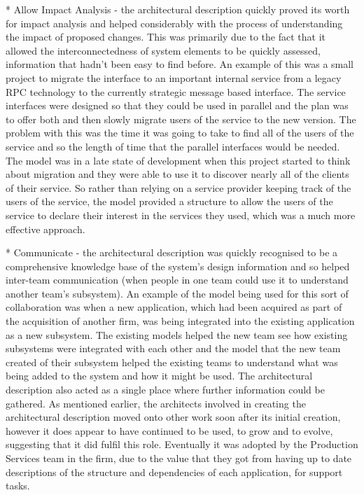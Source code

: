 \begin{itemise}
* Allow Impact Analysis - the architectural description quickly proved its worth for impact analysis and helped considerably with the process of understanding the impact of proposed changes.  This was primarily due to the fact that it allowed the interconnectedness of system elements to be quickly assessed, information that hadn't been easy to find before.  An example of this was a small project to migrate the interface to an important internal service from a legacy RPC technology to the currently strategic message based interface.  The service interfaces were designed so that they could be used in parallel and the plan was to offer both and then slowly migrate users of the service to the new version.  The problem with this was the time it was going to take to find all of the users of the service and so the length of time that the parallel interfaces would be needed.  The model was in a late state of development when this project started to think about migration and they were able to use it to discover nearly all of the clients of their service.  So rather than relying on a service provider keeping track of the users of the service, the model provided a structure to allow the users of the service to declare their interest in the services they used, which was a much more effective approach.

* Communicate - the architectural description was quickly recognised to be a comprehensive knowledge base of the system's design information and so helped inter-team communication (when people in one team could use it to understand another team's subsystem).  An example of the model being used for this sort of collaboration was when a new application, which had been acquired as part of the acquisition of another firm, was being integrated into the existing application as a new subsystem.  The existing models helped the new team see how existing subsystems were integrated with each other and the model that the new team created of their subsystem helped the existing teams to understand what was being added to the system and how it might be used.  The architectural description also acted as a single place where further information could be gathered.  As mentioned earlier, the architects involved in creating the architectural description moved onto other work soon after its initial creation, however it does appear to have continued to be used, to grow and to evolve, suggesting that it did fulfil this role.  Eventually it was adopted by the Production Services team in the firm, due to the value that they got from having up to date descriptions of the structure and dependencies of each application, for support tasks.


\end{itemise}
